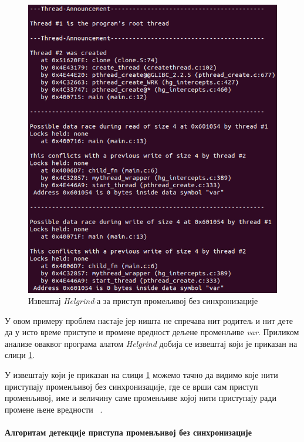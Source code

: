 \documentclass[12pt,oneside]{memoir}
\begin{document}
\begin{figure}[h!]
\begin{center}
\includegraphics[scale=0.75]{slika15.png}
\end{center}
\caption{Извештај \textit{Helgrind}-а за приступ промељивој без синхронизације }
\label{fig:izvestaj}
\end{figure}

\indent У овом примеру проблем настаје јер ништа не спречава нит родитељ и нит дете да у исто време приступе и промене вредност дељене променљиве \textit{var}. Приликом анализе оваквог програма алатом \textit{Helgrind} добија се извештај који је приказан на слици \ref{fig:izvestaj}.

\indent У извештају који је приказан на слици \ref{fig:izvestaj} можемо тачно да видимо које нити приступају променљивој без синхронизације, где се врши сам приступ променљивој, име и величину саме променљиве којој нити приступају ради промене њене вредности ~\cite{helgrindRef}.


\paragraph{Алгоритам детекциjе приступа променљивој без синхронизације} \mbox{}\\
\end{document}
